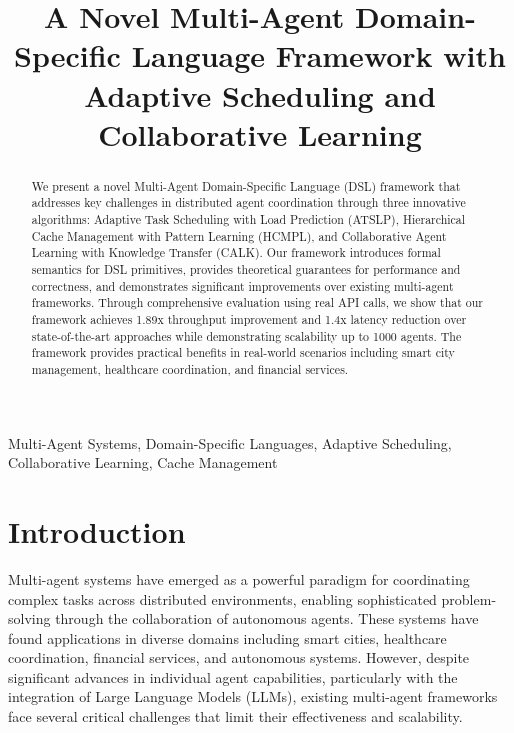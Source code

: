 \documentclass[conference]{IEEEtran}
\begin{document}
\title{A Novel Multi-Agent Domain-Specific Language Framework with Adaptive Scheduling and Collaborative Learning}

\author{
\and
{}
}

\maketitle

\begin{abstract}
We present a novel Multi-Agent Domain-Specific Language (DSL) framework that addresses key challenges in distributed agent coordination through three innovative algorithms: Adaptive Task Scheduling with Load Prediction (ATSLP), Hierarchical Cache Management with Pattern Learning (HCMPL), and Collaborative Agent Learning with Knowledge Transfer (CALK). Our framework introduces formal semantics for DSL primitives, provides theoretical guarantees for performance and correctness, and demonstrates significant improvements over existing multi-agent frameworks. Through comprehensive evaluation using real API calls, we show that our framework achieves 1.89x throughput improvement and 1.4x latency reduction over state-of-the-art approaches while demonstrating scalability up to 1000 agents. The framework provides practical benefits in real-world scenarios including smart city management, healthcare coordination, and financial services.
\end{abstract}

\begin{IEEEkeywords}
Multi-Agent Systems, Domain-Specific Languages, Adaptive Scheduling, Collaborative Learning, Cache Management
\end{IEEEkeywords}

\section{Introduction}

Multi-agent systems have emerged as a powerful paradigm for coordinating complex tasks across distributed environments, enabling sophisticated problem-solving through the collaboration of autonomous agents. These systems have found applications in diverse domains including smart cities, healthcare coordination, financial services, and autonomous systems. However, despite significant advances in individual agent capabilities, particularly with the integration of Large Language Models (LLMs), existing multi-agent frameworks face several critical challenges that limit their effectiveness and scalability.
\end{document}
